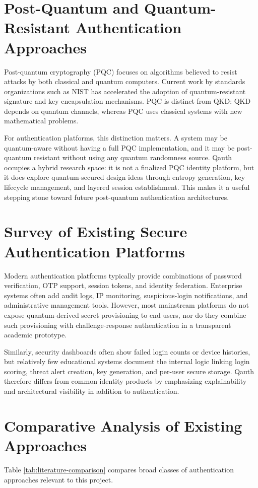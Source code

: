 \section{Post-Quantum and Quantum-Resistant Authentication Approaches}
Post-quantum cryptography (PQC) focuses on algorithms believed to resist attacks by both classical and quantum computers. Current work by standards organizations such as NIST has accelerated the adoption of quantum-resistant signature and key encapsulation mechanisms. PQC is distinct from QKD: QKD depends on quantum channels, whereas PQC uses classical systems with new mathematical problems.

For authentication platforms, this distinction matters. A system may be quantum-aware without having a full PQC implementation, and it may be post-quantum resistant without using any quantum randomness source. Qauth occupies a hybrid research space: it is not a finalized PQC identity platform, but it does explore quantum-secured design ideas through entropy generation, key lifecycle management, and layered session establishment. This makes it a useful stepping stone toward future post-quantum authentication architectures.

\section{Survey of Existing Secure Authentication Platforms}
Modern authentication platforms typically provide combinations of password verification, OTP support, session tokens, and identity federation. Enterprise systems often add audit logs, IP monitoring, suspicious-login notifications, and administrative management tools. However, most mainstream platforms do not expose quantum-derived secret provisioning to end users, nor do they combine such provisioning with challenge-response authentication in a transparent academic prototype.

Similarly, security dashboards often show failed login counts or device histories, but relatively few educational systems document the internal logic linking login scoring, threat alert creation, key generation, and per-user secure storage. Qauth therefore differs from common identity products by emphasizing explainability and architectural visibility in addition to authentication.

\section{Comparative Analysis of Existing Approaches}
Table \ref{tab:literature-comparison} compares broad classes of authentication approaches relevant to this project.

